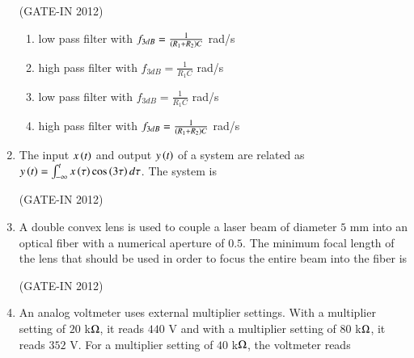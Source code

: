 \documentclass[journal,12pt,onecolumn]{IEEEtran}
\theoremstyle{remark}
\begin{document}
\begin{enumerate}
\hfill{(GATE-IN 2012)}
\begin{enumerate}
    \item low pass filter with $f_{3dB} = \frac{1}{\left(R_1+R_2\right)C}$ rad/s
    \item high pass filter with $f_{3dB} = \frac{1}{R_1 C}$ rad/s
    \item low pass filter with $f_{3dB} = \frac{1}{R_1 C}$ rad/s
    \item high pass filter with $f_{3dB} = \frac{1}{\left(R_1+R_2\right)C}$ rad/s
\end{enumerate}

\item The input $x\left(t\right)$ and output $y\left(t\right)$ of a system are related as $y\left(t\right) = \int_{-\infty}^t x\left(\tau\right)\cos\left(3\tau\right) d\tau$. The system is

\hfill{(GATE-IN 2012)}
\begin{enumerate}
\end{enumerate}

\item A double convex lens is used to couple a laser beam of diameter $5$ mm into an optical fiber with a numerical aperture of $0.5$. The minimum focal length of the lens that should be used in order to focus the entire beam into the fiber is

\hfill{(GATE-IN 2012)}
\begin{enumerate}
\end{enumerate}

\item An analog voltmeter uses external multiplier settings. With a multiplier setting of $20$ k$\ohm$, it reads $440$ V and with a multiplier setting of $80$ k$\ohm$, it reads $352$ V. For a multiplier setting of $40$ k$\ohm$, the voltmeter reads


\end{enumerate}
\end{document}
